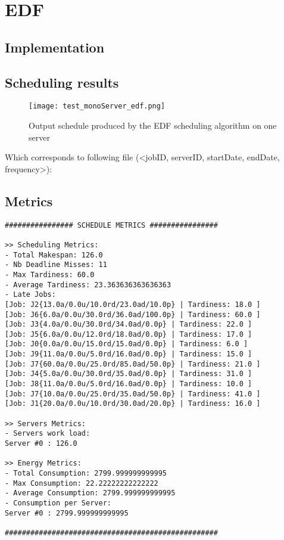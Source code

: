 \documentclass[./report.tex]{subfiles}
\begin{document}
\newpage
\section{EDF}
\subsection{Implementation}

\subsection{Scheduling results}
\begin{figure}[!h]
	\center
	\texttt{[image: test\_monoServer\_edf.png]}
	\caption{Output schedule produced by the EDF scheduling algorithm on one server}
	\label{fig:monoServer_edf} 
\end{figure}

Which corresponds to following file (<jobID, serverID, startDate, endDate, frequency>):


\newpage
\subsection{Metrics}
\begin{lstlisting}[style=txt, caption={Metrics for EDF on a single server}]
################ SCHEDULE METRICS ################

>> Scheduling Metrics: 
- Total Makespan: 126.0
- Nb Deadline Misses: 11
- Max Tardiness: 60.0
- Average Tardiness: 23.363636363636363
- Late Jobs: 
[Job: J2{13.0a/0.0u/10.0rd/23.0ad/10.0p} | Tardiness: 18.0 ]
[Job: J6{6.0a/0.0u/30.0rd/36.0ad/100.0p} | Tardiness: 60.0 ]
[Job: J3{4.0a/0.0u/30.0rd/34.0ad/0.0p} | Tardiness: 22.0 ]
[Job: J5{6.0a/0.0u/12.0rd/18.0ad/0.0p} | Tardiness: 17.0 ]
[Job: J0{0.0a/0.0u/15.0rd/15.0ad/0.0p} | Tardiness: 6.0 ]
[Job: J9{11.0a/0.0u/5.0rd/16.0ad/0.0p} | Tardiness: 15.0 ]
[Job: J7{60.0a/0.0u/25.0rd/85.0ad/50.0p} | Tardiness: 21.0 ]
[Job: J4{5.0a/0.0u/30.0rd/35.0ad/0.0p} | Tardiness: 31.0 ]
[Job: J8{11.0a/0.0u/5.0rd/16.0ad/0.0p} | Tardiness: 10.0 ]
[Job: J7{10.0a/0.0u/25.0rd/35.0ad/50.0p} | Tardiness: 41.0 ]
[Job: J1{20.0a/0.0u/10.0rd/30.0ad/20.0p} | Tardiness: 16.0 ]

>> Servers Metrics: 
- Servers work load:
Server #0 : 126.0

>> Energy Metrics: 
- Total Consumption: 2799.999999999995
- Max Consumption: 22.22222222222222
- Average Consumption: 2799.999999999995
- Consumption per Server: 
Server #0 : 2799.999999999995

##################################################
\end{lstlisting}
\end{document}

